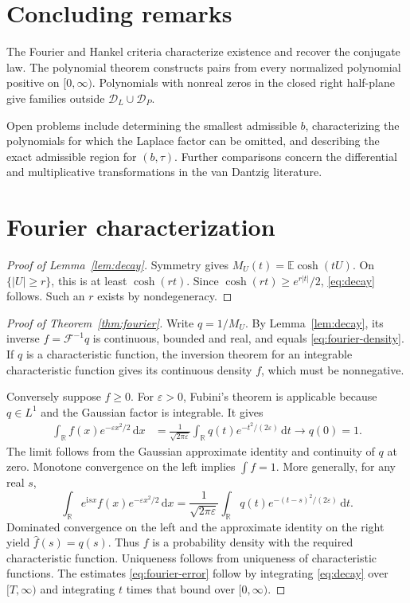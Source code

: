 \documentclass[11pt,twoside]{article}
\theoremstyle{journalplain}
\numberwithin{equation}{section}
\theoremstyle{journaldefinition}
\newcommand{\R}{\mathbb R}
\newcommand{\E}{\mathbb E}
\newcommand{\DL}{\mathcal D_L}
\newcommand{\DP}{\mathcal D_P}
\newcommand{\dd}{\,\mathrm d}
\newcommand{\ii}{\mathrm i}
\begin{document}
\section{Concluding remarks}\label{sec:conclusion}
The Fourier and Hankel criteria characterize existence and recover the conjugate law. The polynomial theorem constructs pairs from every normalized polynomial positive on $[0,\infty)$. Polynomials with nonreal zeros in the closed right half-plane give families outside $\DL\cup\DP$.

Open problems include determining the smallest admissible $b$, characterizing the polynomials for which the Laplace factor can be omitted, and describing the exact admissible region for $(b,\tau)$. Further comparisons concern the differential and multiplicative transformations in the van Dantzig literature.

\appendix
\section{Fourier characterization}\label{app:fourier}
\begin{proof}[Proof of Lemma~\ref{lem:decay}]
Symmetry gives $M_U(t)=\E\cosh(tU)$. On $\{|U|\ge r\}$, this is at least $\cosh(rt)$. Since $\cosh(rt)\ge e^{r|t|}/2$, \eqref{eq:decay} follows. Such an $r$ exists by nondegeneracy.
\end{proof}
\begin{proof}[Proof of Theorem~\ref{thm:fourier}]
Write $q=1/M_U$. By Lemma~\ref{lem:decay}, its inverse $f=\mathcal F^{-1}q$ is continuous, bounded and real, and equals \eqref{eq:fourier-density}. If $q$ is a characteristic function, the inversion theorem for an integrable characteristic function gives its continuous density $f$, which must be nonnegative.

Conversely suppose $f\ge0$. For $\varepsilon>0$, Fubini's theorem is applicable because $q\in L^1$ and the Gaussian factor is integrable. It gives
\begin{align*}
 \int_\R f(x)e^{-\varepsilon x^2/2}\dd x
 &=\frac1{\sqrt{2\pi\varepsilon}}\int_\R q(t)e^{-t^2/(2\varepsilon)}\dd t
 \longrightarrow q(0)=1.
\end{align*}
The limit follows from the Gaussian approximate identity and continuity of $q$ at zero. Monotone convergence on the left implies $\int f=1$. More generally, for any real $s$,
\[
 \int_\R e^{\ii sx}f(x)e^{-\varepsilon x^2/2}\dd x
 =\frac1{\sqrt{2\pi\varepsilon}}\int_\R q(t)e^{-(t-s)^2/(2\varepsilon)}\dd t.
\]
Dominated convergence on the left and the approximate identity on the right yield $\widehat f(s)=q(s)$. Thus $f$ is a probability density with the required characteristic function. Uniqueness follows from uniqueness of characteristic functions. The estimates \eqref{eq:fourier-error} follow by integrating \eqref{eq:decay} over $[T,\infty)$ and integrating $t$ times that bound over $[0,\infty)$.
\end{proof}
\end{document}
